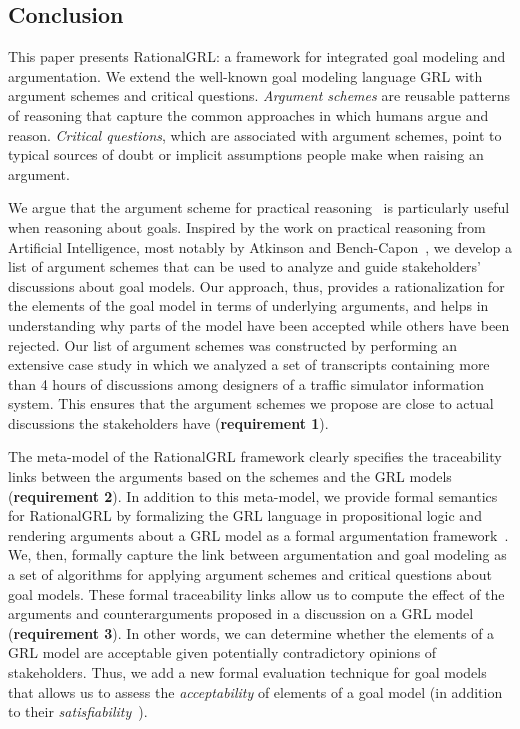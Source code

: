 \subsection{Conclusion}
\label{sect:discussion:conclusion}

This paper presents RationalGRL: a framework for integrated goal modeling and argumentation. We extend the well-known goal modeling language GRL with argument schemes and critical questions. \emph{Argument schemes} are reusable patterns of reasoning that capture the common approaches in which humans argue and reason. \emph{Critical questions}, which are associated with argument schemes, point to typical sources of doubt or implicit assumptions people make when raising an argument. 

We argue that the argument scheme for practical reasoning~\cite{walton1990,atkinson2007} is particularly useful when reasoning about goals. Inspired by the work on practical reasoning from Artificial Intelligence, most notably by Atkinson and Bench-Capon~\cite{atkinson2007}, we develop a list of argument schemes that can be used to analyze and guide stakeholders' discussions about goal models. Our approach, thus, provides a rationalization for the elements of the goal model in terms of underlying arguments, and helps in understanding why parts of the model have been accepted while others have been rejected. Our list of argument schemes was constructed by performing an extensive case study in which we analyzed a set of transcripts containing more than 4 hours of discussions among designers of a traffic simulator information system. This ensures that the argument schemes we propose are close to actual discussions the stakeholders have (\textbf{requirement 1}).  

The meta-model of the RationalGRL framework clearly specifies the traceability links between the arguments based on the schemes and the GRL models (\textbf{requirement 2}). In addition to this meta-model, we provide formal semantics for RationalGRL by formalizing the GRL language in propositional logic and rendering arguments about a GRL model as a formal argumentation framework~\cite{Dung1995}. We, then, formally capture the link between argumentation and goal modeling as a set of algorithms for applying argument schemes and critical questions about goal models. These formal traceability links allow us to compute the effect of the arguments and counterarguments proposed in a discussion on a GRL model (\textbf{requirement 3}). In other words, we can determine whether the elements of a GRL model are acceptable given potentially contradictory opinions of stakeholders. Thus, we add a new formal evaluation technique for goal models that allows us to assess the \emph{acceptability} of elements of a goal model (in addition to their \emph{satisfiability}~\cite{Amyot:2010:EGM:1841349.1841356}).

